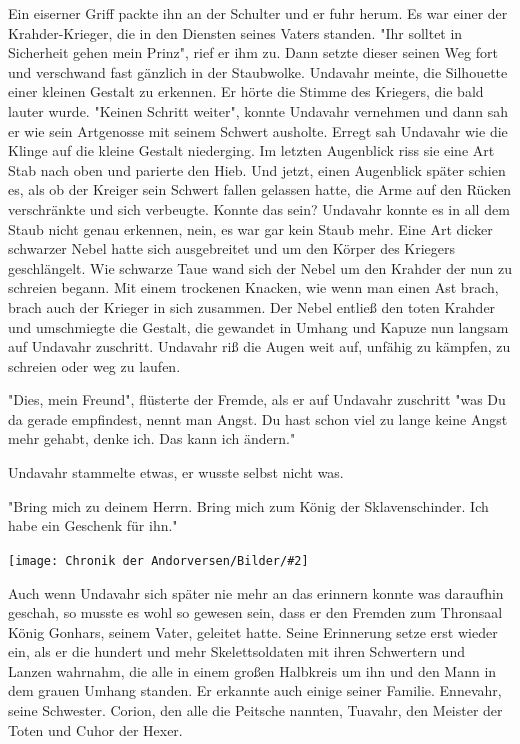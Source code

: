 \documentclass[10pt, a4paper, oneside]{book}
\newcommand{\bildmitts}[2][height=0.32\textwidth,width=0.48\textwidth,keepaspectratio]{%
    \begin{center}
        \texttt{[image: Chronik der Andorversen/Bilder/\#2]}
    \end{center}
}
\begin{document}
\begin{multicols}{2}
Ein eiserner Griff packte ihn an der Schulter und er fuhr herum. Es war einer der Krahder-Krieger, die in den Diensten seines Vaters standen. "Ihr solltet in Sicherheit gehen mein Prinz", rief er ihm zu. Dann setzte dieser seinen Weg fort und verschwand fast gänzlich in der Staubwolke. Undavahr meinte, die Silhouette einer kleinen Gestalt zu erkennen. Er hörte die Stimme des Kriegers, die bald lauter wurde. "Keinen Schritt weiter", konnte Undavahr vernehmen und dann sah er wie sein Artgenosse mit seinem Schwert ausholte. Erregt sah Undavahr wie die Klinge auf die kleine Gestalt niederging. Im letzten Augenblick riss sie eine Art Stab nach oben und parierte den Hieb. Und jetzt, einen Augenblick später schien es, als ob der Kreiger sein Schwert fallen gelassen hatte, die Arme auf den Rücken verschränkte und sich verbeugte. Konnte das sein? Undavahr konnte es in all dem Staub nicht genau erkennen, nein, es war gar kein Staub mehr. Eine Art dicker schwarzer Nebel hatte sich ausgebreitet und um den Körper des Kriegers geschlängelt. Wie schwarze Taue wand sich der Nebel um den Krahder der nun zu schreien begann. Mit einem trockenen Knacken, wie wenn man einen Ast brach, brach auch der Krieger in sich zusammen. Der Nebel entließ den toten Krahder und umschmiegte die Gestalt, die gewandet in Umhang und Kapuze nun langsam auf Undavahr zuschritt. Undavahr riß die Augen weit auf, unfähig zu kämpfen, zu schreien oder weg zu laufen.

"Dies, mein Freund", flüsterte der Fremde, als er auf Undavahr zuschritt "was Du da gerade empfindest, nennt man Angst. Du hast schon viel zu lange keine Angst mehr gehabt, denke ich. Das kann ich ändern."

Undavahr stammelte etwas, er wusste selbst nicht was.

"Bring mich zu deinem Herrn. Bring mich zum König der Sklavenschinder. Ich habe ein Geschenk für ihn."\bigskip

\bildmitts{Das Geschenk des Magiers Bild 1.jpg}

Auch wenn Undavahr sich später nie mehr an das erinnern konnte was daraufhin geschah, so musste es wohl so gewesen sein, dass er den Fremden zum Thronsaal König Gonhars, seinem Vater, geleitet hatte. Seine Erinnerung setze erst wieder ein, als er die hundert und mehr Skelettsoldaten mit ihren Schwertern und Lanzen wahrnahm, die alle in einem großen Halbkreis um ihn und den Mann in dem grauen Umhang standen. Er erkannte auch einige seiner Familie. Ennevahr, seine Schwester. Corion, den alle die Peitsche nannten, Tuavahr, den Meister der Toten und Cuhor der Hexer.


\end{multicols}
\end{document}
